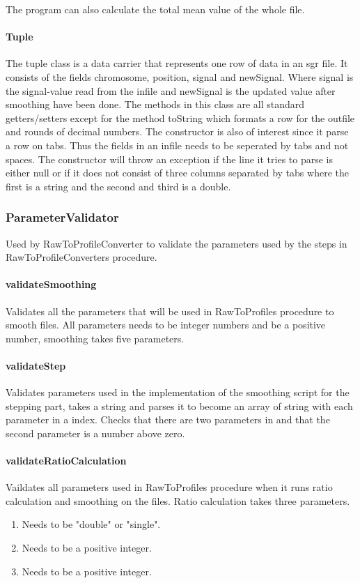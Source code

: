 The program can also calculate the total mean value of the whole file.



\paragraph{Tuple}
The tuple class is a data carrier that represents one row of data in an sgr file. It consists of the fields chromosome, position, signal and newSignal. Where signal is the signal-value read from the infile and newSignal is the updated value after smoothing have been done.
The methods in this class are all standard getters/setters except for the method toString which formats a row for the outfile and rounds of decimal numbers. The constructor is also of interest since it parse a row on tabs. Thus the fields in an infile needs to be seperated by tabs and not spaces. The constructor will throw an exception if the line it tries to parse is either null or if it does not consist of three columns separated by tabs where the first is a string and the second and third is a double.


\subsubsection{ParameterValidator}

Used by RawToProfileConverter to validate the parameters used by the steps in RawToProfileConverters procedure.

\paragraph{validateSmoothing} 
Validates all the parameters that will be used in RawToProfiles procedure to smooth files. All parameters needs to be integer numbers and be a positive number, smoothing takes five parameters. 


\paragraph{validateStep}
Validates parameters used in the implementation of the smoothing script for the stepping part, takes a string and parses it to become an array of string with each parameter in a index. Checks that there are two parameters in and that the second parameter is a number above zero.

\paragraph{validateRatioCalculation}
Vaildates all parameters used in RawToProfiles procedure when it runs ratio calculation and 
smoothing on the files. Ratio calculation takes three parameters.
\begin{enumerate}
\item Needs to be "double" or "single".
\item Needs to be a positive integer.
\item Needs to be a positive integer.
\end{enumerate}

